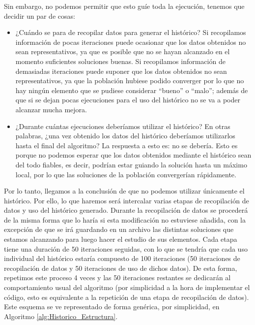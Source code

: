Sin embargo, no podemos permitir que esto guíe toda la ejecución, tenemos que decidir un par de cosas:
\begin{itemize}
	\item ¿Cuándo se para de recopilar datos para generar el histórico? 
	Si recopilamos información de pocas iteraciones puede ocasionar que los datos obtenidos no sean representativos, ya que es posible que no se hayan alcanzado en el momento suficientes soluciones buenas. 
	Si recopilamos información de demasiadas iteraciones puede suponer que los datos obtenidos no sean representativos, ya que la población hubiese podido converger por lo que no hay ningún elemento que se pudiese considerar ``bueno'' o ``malo''; además de que si se dejan pocas ejecuciones para el uso del histórico no se va a poder alcanzar mucha mejora. 
	\item ¿Durante cuántas ejecuciones deberíamos utilizar el histórico? 
	En otras palabras, ¿una vez obtenido los datos del histórico deberíamos utilizarlos hasta el final del algoritmo? 
	La respuesta a esto es: no se debería. 
	Esto es porque no podemos esperar que los datos obtenidos mediante el histórico sean del todo fiables, es decir, podrían estar guiando la solución hasta un máximo local, por lo que las soluciones de la población convergerían rápidamente. 
\end{itemize}

Por lo tanto, llegamos a la conclusión de que no podemos utilizar únicamente el histórico. 
Por ello, lo que haremos será intercalar varias etapas de recopilación de datos y uso del histórico generado. 
Durante la recopilación de datos se procederá de la misma forma que lo haría si esta modificación no estuviese añadida, con la excepción de que se irá guardando en un archivo las distintas soluciones que estamos alcanzando para luego hacer el estudio de sus elementos. 
Cada etapa tiene una duración de 50 iteraciones seguidas, con lo que se tendría que cada uso individual del histórico estaría compuesto de 100 iteraciones (50 iteraciones de recopilación de datos y 50 iteraciones de uso de dichos datos). 
De esta forma, repetimos este proceso 4 veces y las 50 iteraciones restantes se dedicarán al comportamiento usual del algoritmo (por simplicidad a la hora de implementar el código, esto es equivalente a la repetición de una etapa de recopilación de datos). 
Este esquema se ve representado de forma genérica, por simplicidad, en Algoritmo \ref{alg:Historico_Estructura}.

